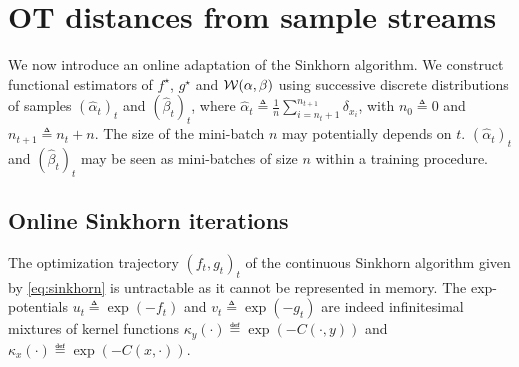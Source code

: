 
\section{OT distances from sample streams}

We now introduce an online adaptation of the Sinkhorn algorithm. We construct functional estimators of $f^\star$, $g^\star$
and $\mathcal{W}(\alpha,\beta)$ using successive discrete distributions of samples ${(\hat \alpha_t)}_t$
and ${(\hat \beta_t)}_t$, where $\hat\alpha_t \triangleq \frac{1}{n} \sum_{i=n_t +
1}^{n_{t+1}} \delta_{x_i}$, with  $n_0 \triangleq 0$ and $n_{t+1} \triangleq n_{t} +
n$. The size of the mini-batch $n$ may potentially depends on $t$.
${(\hat \alpha_t)}_t$ and ${(\hat \beta_t)}_t$ may be
seen as mini-batches of size $n$ within a training procedure.
%
% 


\subsection{Online Sinkhorn iterations}
\label{sec-online-sink-iter}

The optimization trajectory ${(f_t, g_t)}_t$ of the continuous Sinkhorn
algorithm given by \eqref{eq:sinkhorn} is untractable as it cannot be
represented in memory. The exp-potentials $u_t \triangleq \exp(- f_t)$ and $v_t
\triangleq \exp(-g_t)$ are indeed infinitesimal mixtures of kernel functions
$\kappa_y(\cdot) \eqdef \exp(-C(\cdot, y))$ and $\kappa_x(\cdot) \eqdef \exp(-C(x, \cdot))$. 

